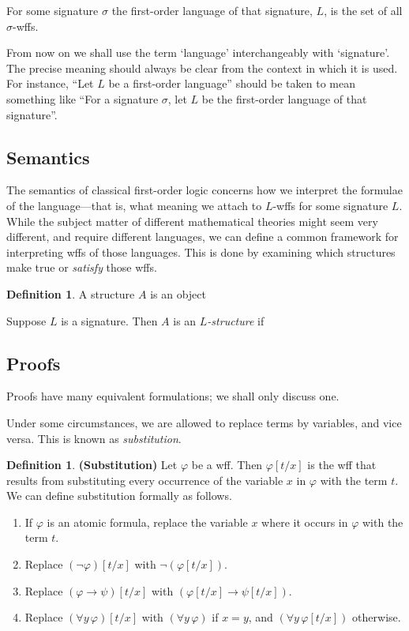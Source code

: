 \documentclass[10pt, a4paper, oneside]{article}
\theoremstyle{definition}
\newtheorem{dfn}[thm]{Definition}
\theoremstyle{remark}
\theoremstyle{plain}
\begin{document}
For some signature $\sigma$ the first-order language of that signature, $L$, is
the set of all $\sigma$-wffs.

From now on we shall use the term `language' interchangeably with `signature'.
The precise meaning should always be clear from the context in which it is used.
For instance, ``Let $L$ be a first-order language'' should be taken to mean
something like ``For a signature $\sigma$, let $L$ be the first-order language
of that signature''.


\subsection{Semantics}

The semantics of classical first-order logic concerns how we interpret the
formulae of the language---that is, what meaning we attach to $L$-wffs for some
signature $L$. While the subject matter of different mathematical theories might
seem very different, and require different languages, we can define a common
framework for interpreting wffs of those languages. This is done by examining
which structures make true or \emph{satisfy} those wffs.

\begin{dfn}
    A structure $A$ is an object
    
    Suppose $L$ is a signature. Then $A$ is an \emph{$L$-structure} if
\end{dfn}


\subsection{Proofs}

Proofs have many equivalent formulations; we shall only discuss one.

Under some circumstances, we are allowed to replace terms by variables, and vice
versa. This is known as \emph{substitution}.

\begin{dfn}
    \textbf{(Substitution)}
    Let $\varphi$ be a wff. Then $\varphi[t / x]$ is the wff that results from
    substituting every occurrence of the variable $x$ in $\varphi$ with the term
    $t$. We can define substitution formally as follows.
    
    \begin{enumerate}
        \item If $\varphi$ is an atomic formula, replace the variable $x$ where
            it occurs in $\varphi$ with the term $t$.
        \item Replace $(\neg \varphi) [t / x]$ with $\neg (\varphi [t / x])$.
        \item Replace $(\varphi \rightarrow \psi) [t / x]$ with $(\varphi[t / x]
            \rightarrow \psi[t / x])$.
        \item Replace $(\forall{y} \, \varphi) [t / x]$ with
            $(\forall{y} \, \varphi)$ if $x = y$, and
            $(\forall{y} \, \varphi[t / x])$ otherwise.
    \end{enumerate}
\end{dfn}
\end{document}
